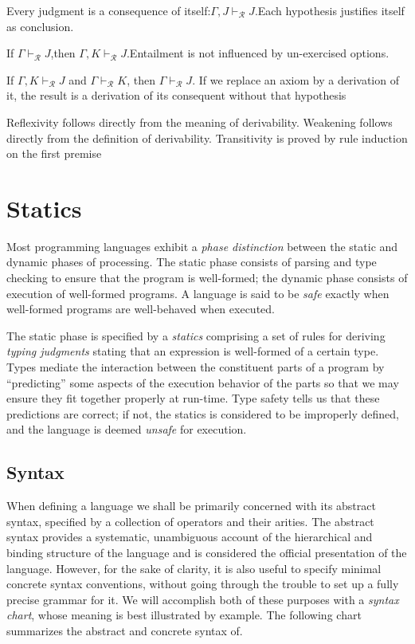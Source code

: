 \begin{property}[Reflexivity]
    Every judgment is a consequence of itself:$\Gamma, J \vdash_\mathcal{R} J$.Each hypothesis justifies itself as conclusion.
\end{property}

\begin{property}[Weakening]
  If $\Gamma \vdash_\mathcal{R} J$,then $\Gamma, K \vdash_\mathcal{R} J$.Entailment  is  not  influenced  by  un-exercised options.
\end{property}

\begin{property}[Transitivity]
  If $\Gamma, K \vdash_\mathcal{R} J$ and $\Gamma \vdash_\mathcal{R} K$, then
  $\Gamma \vdash_\mathcal{R} J$. If we replace an axiom  by a derivation of it,
  the result is a derivation of its consequent without that  hypothesis
\end{property}

Reflexivity follows directly from the meaning of derivability. Weakening follows directly
from the definition of derivability. Transitivity is proved by rule induction on the first
premise

\section{Statics}
Most programming languages exhibit a \textit{phase distinction} between the
static and dynamic phases of processing. The static phase consists of parsing
and type checking to ensure that the program is well-formed; the dynamic phase
consists of execution of well-formed programs. A language is said to be
\textit{safe} exactly when well-formed programs are well-behaved when executed.

The static phase is specified by a \textit{statics} comprising a set of rules
for deriving \textit{typing judgments} stating that an expression is well-formed
of a certain type. Types mediate the interaction between the constituent parts
of a program by “predicting” some aspects of the execution behavior of the parts
so that we may ensure they fit together properly at run-time. Type safety tells
us that these predictions are correct; if not, the statics is considered to be
improperly defined, and the language is deemed \textit{unsafe} for execution.

\subsection{Syntax}
When defining a language we shall be primarily concerned with its abstract syntax,
specified by a collection of operators and their arities. The abstract syntax
provides a systematic, unambiguous account of the hierarchical and binding
structure of the language and is considered the official presentation of the language.
However, for the sake of clarity, it is also useful to specify minimal concrete syntax
conventions, without going through the trouble to set up a fully precise grammar for
it.
We will accomplish both of these purposes with a \textit{syntax chart}, whose meaning is
best illustrated by example. The following chart summarizes the abstract and concrete
syntax of.

